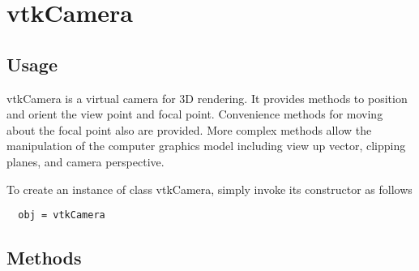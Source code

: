 \section{vtkCamera}

\subsection{Usage}

 vtkCamera is a virtual camera for 3D rendering. It provides methods
 to position and orient the view point and focal point. Convenience 
 methods for moving about the focal point also are provided. More 
 complex methods allow the manipulation of the computer graphics
 model including view up vector, clipping planes, and 
 camera perspective.

To create an instance of class vtkCamera, simply
invoke its constructor as follows
\begin{verbatim}
  obj = vtkCamera
\end{verbatim}
\subsection{Methods}

